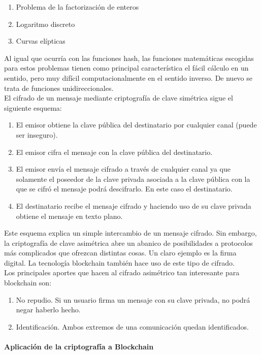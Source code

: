 \begin{enumerate}
	\item Problema de la factorización de enteros
	\item Logaritmo discreto
	\item Curvas elípticas
\end{enumerate}

Al igual que ocurría con las funciones hash, las funciones matemáticas escogidas para estos problemas tienen como principal característica el fácil cálculo en un sentido, pero muy difícil computacionalmente en el sentido inverso. De nuevo se trata de funciones unidireccionales. \\
El cifrado de un mensaje mediante criptografía de clave simétrica sigue el siguiente esquema:

\begin{enumerate}
	\item El emisor obtiene la clave pública del destinatario por cualquier canal (puede ser inseguro).
	\item El emisor cifra el mensaje con la clave pública del destinatario.
	\item El emisor envía el mensaje cifrado a través de cualquier canal ya que solamente el poseedor de la clave privada asociada a la clave pública con la que se cifró el mensaje podrá descifrarlo. En este caso el destinatario.
	\item El destinatario recibe el mensaje cifrado y haciendo uso de su clave privada obtiene el mensaje en texto plano.
\end{enumerate}

Este esquema explica un simple intercambio de un mensaje cifrado. Sin embargo, la criptografía de clave asimétrica abre un abanico de posibilidades a protocolos más complicados que ofrezcan distintas cosas. Un claro ejemplo es la firma digital. La tecnología blockchain también hace uso de este tipo de cifrado. \\
Los principales aportes que hacen al cifrado asimétrico tan interesante para blockchain son:

\begin{enumerate}
	\item No repudio. Si un usuario firma un mensaje con su clave privada, no podrá negar haberlo hecho.
	\item Identificación. Ambos extremos de una comunicación quedan identificados.
\end{enumerate}

\paragraph{Aplicación de la criptografía a Blockchain}

